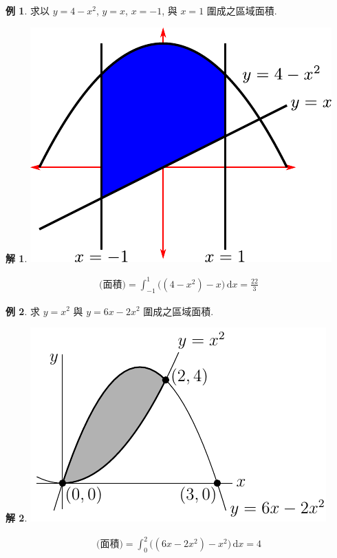 \documentclass[12pt]{extarticle}
\theoremstyle{definition}
\newtheorem*{ex}{例}
\newtheorem*{sol}{解}
\begin{document}
\begin{ex}           
  求以 $y = 4 - x^2$, $y = x$, $x = -1$, 與 $x=1$ 圍成之區域面積.
\end{ex}

\begin{sol}
  \begin{minipage}{.4\textwidth}
    \hspace{1cm}\includegraphics[scale=.7]{area_between3}
  \end{minipage}
  \begin{minipage}{.6\textwidth}
    \begin{align*}
      \text{(面積)} = \int_{-1}^1\!\big((4 - x^2) - x\big)\,\text{d}x = \frac{22}{3}
    \end{align*}
  \end{minipage}
\end{sol}

\begin{ex}
  求 $y = x^2$ 與 $y = 6x - 2x^2$ 圍成之區域面積.
\end{ex}

\begin{sol}
  \begin{minipage}{.3\textwidth}
    \hspace{5mm}\includegraphics[scale=1]{areaSMPL}
  \end{minipage}
  \begin{minipage}{.7\textwidth}
    \begin{align*}
      \text{(面積)} = \int_0^2\!\big((6x - 2x^2) - x^2\big)\,\text{d}x = 4
    \end{align*}
  \end{minipage}
\end{sol}
\end{document}
